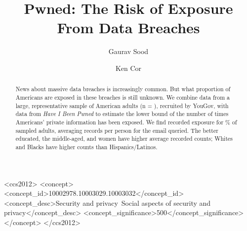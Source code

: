 \documentclass[sigconf]{acmart}
\begin{document}

%
\title[Pwned]{Pwned: The Risk of Exposure From Data Breaches}

%
\author{Gaurav Sood}
\authornotemark[1]


\author{Ken Cor}
\authornotemark[2]
\affiliation{%
  \institution{The University of Alberta}
  \city{Edmonton}
  \country{Canada}
}
%
\renewcommand{\shortauthors}{Sood and Cor}

%
\begin{abstract}
News about massive data breaches is increasingly common. But what proportion of Americans are exposed in these breaches is still unknown. We combine data from a large, representative sample of American adults (n = \sampleSize{}), recruited by YouGov, with data from \textit{Have I Been Pwned} to estimate the lower bound of the number of times Americans' private information has been exposed. We find recorded exposure for \exposedPercent{}\% of sampled adults, averaging \meanExposures{} records per person for the email queried. The better educated, the middle-aged, and women have higher average recorded counts; Whites and Blacks have higher counts than Hispanics/Latinos.
\end{abstract}

%
%
\begin{CCSXML}
<ccs2012>
<concept>
<concept_id>10002978.10003029.10003032</concept_id>
<concept_desc>Security and privacy~Social aspects of security and privacy</concept_desc>
<concept_significance>500</concept_significance>
</concept>
</ccs2012>
\end{CCSXML}
\end{document}

